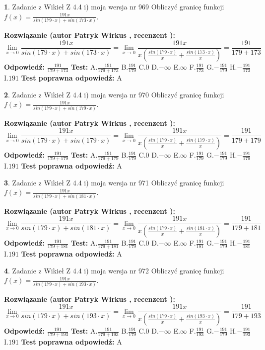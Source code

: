 \documentclass[12pt, a4paper]{article}
\theoremstyle{definition} %
\newtheorem{zad}{}
\newcommand{\zadStart}[1]{\begin{zad}#1\newline}
\newcommand{\zadStop}{\end{zad}}
\newcommand{\rozwStart}[2]{\noindent \textbf{Rozwiązanie (autor #1 , recenzent #2): }\newline}
\newcommand{\rozwStop}{\newline}
\newcommand{\odpStart}{\noindent \textbf{Odpowiedź:}\newline}
\newcommand{\odpStop}{\newline}
\newcommand{\testStart}{\noindent \textbf{Test:}\newline}
\newcommand{\testStop}{\newline}
\newcommand{\kluczStart}{\noindent \textbf{Test poprawna odpowiedź:}\newline}
\newcommand{\kluczStop}{\newline}
\begin{document}
\zadStart{Zadanie z Wikieł Z 4.4 i) moja wersja nr 969}
Obliczyć granicę funkcji $f(x)=\frac{191x}{sin(179\cdot x) +sin(173\cdot x)}$.
\zadStop
\rozwStart{Patryk Wirkus}{}
$$\lim\limits_{x\to 0}\frac{191x}{sin(179\cdot x) +sin(173\cdot x)}=\lim\limits_{x\to 0}\frac{191x}{x(\frac{sin(179\cdot x)}{x}+\frac{sin(173\cdot x)}{x})}=\frac{191}{179+173}$$
\rozwStop
\odpStart
$\frac{191}{179+173}$
\odpStop
\testStart
A.$\frac{191}{179+173}$
B.$\frac{191}{179}$
C.$0$
D.$-\infty$
E.$\infty$
F.$\frac{191}{173}$
G.$-\frac{191}{179}$
H.$-\frac{191}{173}$
I.$191$
\testStop
\kluczStart
A
\kluczStop



\zadStart{Zadanie z Wikieł Z 4.4 i) moja wersja nr 970}
Obliczyć granicę funkcji $f(x)=\frac{191x}{sin(179\cdot x) +sin(179\cdot x)}$.
\zadStop
\rozwStart{Patryk Wirkus}{}
$$\lim\limits_{x\to 0}\frac{191x}{sin(179\cdot x) +sin(179\cdot x)}=\lim\limits_{x\to 0}\frac{191x}{x(\frac{sin(179\cdot x)}{x}+\frac{sin(179\cdot x)}{x})}=\frac{191}{179+179}$$
\rozwStop
\odpStart
$\frac{191}{179+179}$
\odpStop
\testStart
A.$\frac{191}{179+179}$
B.$\frac{191}{179}$
C.$0$
D.$-\infty$
E.$\infty$
F.$\frac{191}{179}$
G.$-\frac{191}{179}$
H.$-\frac{191}{179}$
I.$191$
\testStop
\kluczStart
A
\kluczStop



\zadStart{Zadanie z Wikieł Z 4.4 i) moja wersja nr 971}
Obliczyć granicę funkcji $f(x)=\frac{191x}{sin(179\cdot x) +sin(181\cdot x)}$.
\zadStop
\rozwStart{Patryk Wirkus}{}
$$\lim\limits_{x\to 0}\frac{191x}{sin(179\cdot x) +sin(181\cdot x)}=\lim\limits_{x\to 0}\frac{191x}{x(\frac{sin(179\cdot x)}{x}+\frac{sin(181\cdot x)}{x})}=\frac{191}{179+181}$$
\rozwStop
\odpStart
$\frac{191}{179+181}$
\odpStop
\testStart
A.$\frac{191}{179+181}$
B.$\frac{191}{179}$
C.$0$
D.$-\infty$
E.$\infty$
F.$\frac{191}{181}$
G.$-\frac{191}{179}$
H.$-\frac{191}{181}$
I.$191$
\testStop
\kluczStart
A
\kluczStop



\zadStart{Zadanie z Wikieł Z 4.4 i) moja wersja nr 972}
Obliczyć granicę funkcji $f(x)=\frac{191x}{sin(179\cdot x) +sin(193\cdot x)}$.
\zadStop
\rozwStart{Patryk Wirkus}{}
$$\lim\limits_{x\to 0}\frac{191x}{sin(179\cdot x) +sin(193\cdot x)}=\lim\limits_{x\to 0}\frac{191x}{x(\frac{sin(179\cdot x)}{x}+\frac{sin(193\cdot x)}{x})}=\frac{191}{179+193}$$
\rozwStop
\odpStart
$\frac{191}{179+193}$
\odpStop
\testStart
A.$\frac{191}{179+193}$
B.$\frac{191}{179}$
C.$0$
D.$-\infty$
E.$\infty$
F.$\frac{191}{193}$
G.$-\frac{191}{179}$
H.$-\frac{191}{193}$
I.$191$
\testStop
\kluczStart
A
\kluczStop
\end{document}
